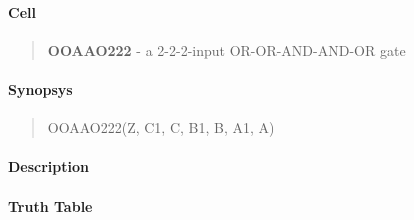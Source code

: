 \label{OOAAO222}
\paragraph{Cell}
\begin{quote}
    \textbf{OOAAO222} - a 2-2-2-input OR-OR-AND-AND-OR gate
\end{quote}

\paragraph{Synopsys}
\begin{quote}
    OOAAO222(Z, C1, C, B1, B, A1, A)
\end{quote}

\paragraph{Description}

%

\paragraph{Truth Table}
%

